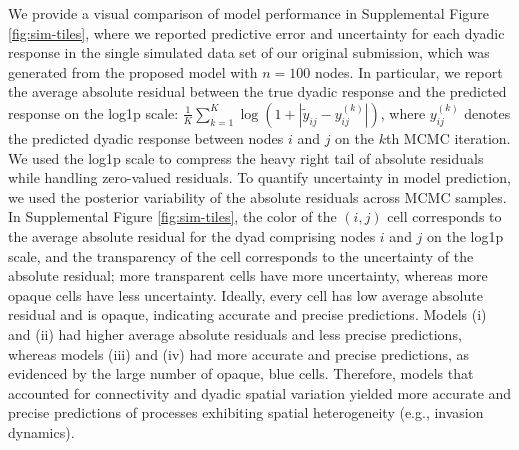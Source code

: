 \documentclass{article}
\begin{document}
We provide a visual comparison of model performance in Supplemental Figure \ref{fig:sim-tiles}, where we reported predictive error and uncertainty for each dyadic response in the single simulated data set of our original submission, which was generated from the proposed model with $n=100$ nodes. 
In particular, we report the average absolute residual between the true dyadic response and the predicted response on the log1p scale: $\frac{1}{K}\sum^K_{k=1}\log(1+|\widetilde{y}_{ij}-y_{ij}^{(k)}|)$, where $y_{ij}^{(k)}$ denotes the predicted dyadic response between nodes $i$ and $j$ on the $k$th MCMC iteration. We used the log1p scale to compress the heavy right tail of absolute residuals while handling zero-valued residuals. 
To quantify uncertainty in model prediction, we used the posterior variability of the absolute residuals across MCMC samples. In Supplemental Figure \ref{fig:sim-tiles}, the color of the $(i,j)$ cell corresponds to the average absolute residual for the dyad comprising nodes $i$ and $j$ on the log1p scale, and the transparency of the cell corresponds to the uncertainty of the absolute residual; more transparent cells have more uncertainty, whereas more opaque cells have less uncertainty. Ideally, every cell has low average absolute residual and is opaque, indicating accurate and precise predictions. Models (i) and (ii) had higher average absolute residuals and less precise predictions, whereas models (iii) and (iv) had more accurate and precise predictions, as evidenced by the large number of opaque, blue cells. 
Therefore, models that accounted for connectivity and dyadic spatial variation yielded more accurate and precise predictions of processes exhibiting spatial heterogeneity (e.g., invasion dynamics).
\end{document}
